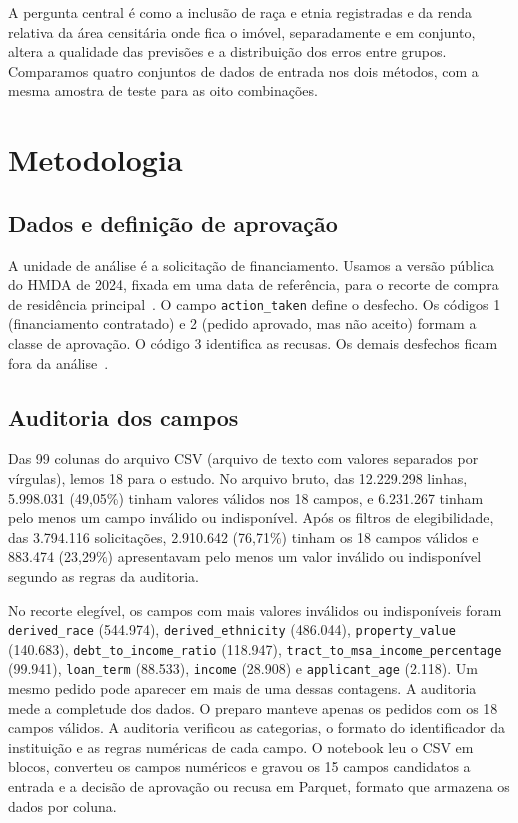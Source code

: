 \documentclass[12pt]{article}
\begin{document}
A pergunta central é como a inclusão de raça e etnia registradas e da
renda relativa da área censitária onde fica o imóvel, separadamente e em
conjunto, altera a qualidade das previsões e a distribuição dos erros
entre grupos. Comparamos quatro conjuntos de dados de entrada nos dois métodos, com a
mesma amostra de teste para as oito combinações.

\section{Metodologia}

\subsection{Dados e definição de aprovação}

A unidade de análise é a solicitação de financiamento. Usamos a versão
pública do HMDA de 2024, fixada em uma data de referência, para o recorte de compra
de residência principal~\cite{ffiec:2024}. O campo \texttt{action\_taken}
define o desfecho. Os códigos 1 (financiamento contratado) e 2 (pedido
aprovado, mas não aceito) formam a classe de aprovação. O código 3
identifica as recusas. Os demais desfechos ficam fora da
análise~\cite{ffiec:lar}.

\subsection{Auditoria dos campos}

Das 99 colunas do arquivo CSV (arquivo de texto com valores separados
por vírgulas), lemos 18 para o estudo. No arquivo bruto, das
12.229.298 linhas, 5.998.031 (49,05\%) tinham valores válidos nos 18
campos, e 6.231.267 tinham pelo menos um campo inválido ou
indisponível. Após os filtros de elegibilidade, das 3.794.116
solicitações, 2.910.642 (76,71\%) tinham os 18 campos válidos e
883.474 (23,29\%) apresentavam pelo menos um valor inválido ou
indisponível segundo as regras da auditoria.

No recorte elegível, os campos com mais valores inválidos ou
indisponíveis foram \texttt{derived\_race} (544.974),
\texttt{derived\_ethnicity} (486.044), \texttt{property\_value}
(140.683), \texttt{debt\_to\_income\_ratio} (118.947),
\texttt{tract\_to\_msa\_income\_percentage} (99.941),
\texttt{loan\_term} (88.533), \texttt{income} (28.908) e
\texttt{applicant\_age} (2.118). Um mesmo pedido pode aparecer em
mais de uma dessas contagens. A auditoria mede a completude dos dados.
O preparo manteve apenas os pedidos com os 18 campos válidos.
A auditoria verificou as categorias, o formato do identificador da
instituição e as regras numéricas de cada campo. O notebook leu
o CSV em blocos, converteu os campos numéricos e gravou os 15
campos candidatos a entrada e a decisão de aprovação ou recusa em
Parquet, formato que armazena os dados por coluna.
\end{document}
